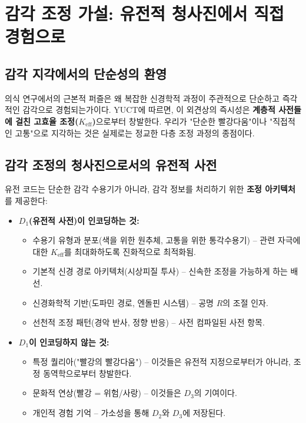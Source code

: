 \documentclass[12pt,a4paper]{article}
\newcommand{\eff}{\mathrm{eff}}
\newcommand{\Ke}{K_{\eff}}
\begin{document}
	\section{감각 조정 가설: 유전적 청사진에서 직접 경험으로}
	
	\subsection{감각 지각에서의 단순성의 환영}
	
	의식 연구에서의 근본적 퍼즐은 왜 복잡한 신경학적 과정이 주관적으로 단순하고 즉각적인 감각으로 경험되는가이다. YUCT에 따르면, 이 외견상의 즉시성은 \textbf{계층적 사전들에 걸친 고효율 조정(\(\Ke\))}으로부터 창발한다. 우리가 "단순한 빨강다움"이나 "직접적인 고통"으로 지각하는 것은 실제로는 정교한 다층 조정 과정의 종점이다.
	
	\subsection{감각 조정의 청사진으로서의 유전적 사전}
	
	유전 코드는 단순한 감각 수용기가 아니라, 감각 정보를 처리하기 위한 \textbf{조정 아키텍처}를 제공한다:
	
	\begin{itemize}
		\item \textbf{\(D_1\)(유전적 사전)이 인코딩하는 것:}
		\begin{itemize}
			\item 수용기 유형과 분포(색을 위한 원추체, 고통을 위한 통각수용기) – 관련 자극에 대한 \(\Ke\)를 최대화하도록 진화적으로 최적화됨.
			\item 기본적 신경 경로 아키텍처(시상피질 투사) – 신속한 조정을 가능하게 하는 배선.
			\item 신경화학적 기반(도파민 경로, 엔돌핀 시스템) – 공명 \(R\)의 조절 인자.
			\item 선천적 조정 패턴(경악 반사, 정향 반응) – 사전 컴파일된 사전 항목.
		\end{itemize}
		
		\item \textbf{\(D_1\)이 인코딩하지 않는 것:}
		\begin{itemize}
			\item 특정 퀄리아("빨강의 빨강다움") – 이것들은 유전적 지정으로부터가 아니라, 조정 동역학으로부터 창발한다.
			\item 문화적 연상(빨강 = 위험/사랑) – 이것들은 \(D_3\)의 기여이다.
			\item 개인적 경험 기억 – 가소성을 통해 \(D_2\)와 \(D_3\)에 저장된다.
		\end{itemize}
	\end{itemize}
	
\end{document}

